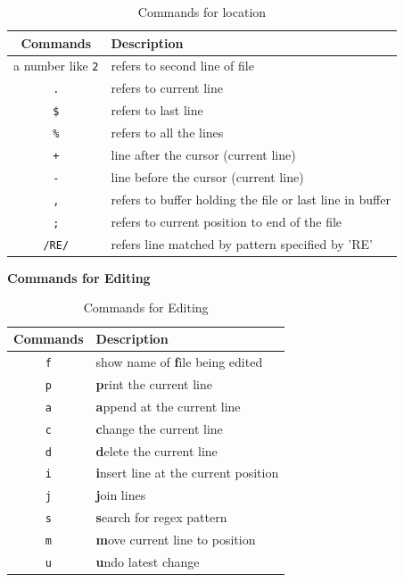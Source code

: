 \begin{table}[h!]
  \caption{Commands for location}
\begin{tabular}{ c l }
\toprule
Commands & Description \\
\midrule
a number like \texttt{2} & refers to second line of file \\
\texttt{.} & refers to current line \\
\texttt{\$} & refers to last line \\
\texttt{\%} & refers to all the lines \\
\texttt{+} & line after the cursor (current line) \\
\texttt{-} & line before the cursor (current line) \\
\texttt{,} & refers to buffer holding the file or last line in buffer \\
\texttt{;} & refers to current position to end of the file \\
\texttt{/RE/} & refers line matched by pattern specified by 'RE' \\
\bottomrule
\end{tabular}
\end{table}


\textbf{Commands for Editing}

\begin{table}[h!]
  \caption{Commands for Editing}
  \begin{tabular}{ c l }
    \toprule
    Commands & Description \\
    \midrule
    \texttt{f} & show name of \textbf{f}ile being edited \\
    \texttt{p} & \textbf{p}rint the current line \\
    \texttt{a} & \textbf{a}ppend at the current line \\
    \texttt{c} & \textbf{c}hange the current line \\
    \texttt{d} & \textbf{d}elete the current line \\
    \texttt{i} & \textbf{i}nsert line at the current position \\
    \texttt{j} & \textbf{j}oin lines \\
    \texttt{s} & \textbf{s}earch for regex pattern \\
    \texttt{m} & \textbf{m}ove current line to position \\
    \texttt{u} & \textbf{u}ndo latest change \\
    \bottomrule
  \end{tabular}
\end{table}

